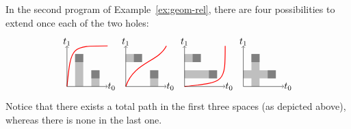 \documentclass[orivec]{llncs} \usepackage[T1]{fontenc}
\begin{document}
In the second program of Example~\ref{ex:geom-rel}, there are four possibilities
to extend once each of the two holes:
\begin{equation}
  \label{eq:ex-hole-ext}
  \begin{tikzpicture}[scale=.3]
    \draw[line width=0.3mm,color=red] (0,0) .. controls (.5,5) .. (5,5);
    \fill[fill=lightgray] (1,0) -- (1,4) -- (2,4) -- (2,0) -- cycle;
    \fill[fill=lightgray] (3,0) -- (3,2) -- (4,2) -- (4,0) -- cycle;
    \fill[fill=gray] (1,3) -- (2,3) -- (2,4) -- (1,4) -- cycle;
    \fill[fill=gray] (3,1) -- (4,1) -- (4,2) -- (3,2) -- cycle;
    \draw[->] (0,0) -- (5,0);
    \draw[->] (0,0) -- (0,5);
    \draw (5.5,0) node {$t_0$};
    \draw (0,5.5) node {$t_1$};
  \end{tikzpicture}
  \begin{tikzpicture}[scale=.3]
    \draw[line width=0.3mm,color=red] (0,0) .. controls (1,3) and (4,3) .. (5,5);
    \fill[fill=lightgray] (0,3) -- (0,4) -- (2,4) -- (2,3) -- cycle;
    \fill[fill=lightgray] (3,0) -- (3,2) -- (4,2) -- (4,0) -- cycle;
    \fill[fill=gray] (1,3) -- (2,3) -- (2,4) -- (1,4) -- cycle;
    \fill[fill=gray] (3,1) -- (4,1) -- (4,2) -- (3,2) -- cycle;
    \draw[->] (0,0) -- (5,0);
    \draw[->] (0,0) -- (0,5);
    \draw (5.5,0) node {$t_0$};
    \draw (0,5.5) node {$t_1$};
  \end{tikzpicture}
  \begin{tikzpicture}[scale=.3]
    \draw[line width=0.3mm,color=red] (0,0) .. controls (5,.5) .. (5,5);
    \fill[fill=lightgray] (0,1) -- (4,1) -- (4,2) -- (0,2) -- cycle;
    \fill[fill=lightgray] (0,3) -- (2,3) -- (2,4) -- (0,4) -- cycle;
    \fill[fill=gray] (1,3) -- (2,3) -- (2,4) -- (1,4) -- cycle;
    \fill[fill=gray] (3,1) -- (4,1) -- (4,2) -- (3,2) -- cycle;
    \draw[->] (0,0) -- (5,0);
    \draw[->] (0,0) -- (0,5);
    \draw (5.5,0) node {$t_0$};
    \draw (0,5.5) node {$t_1$};
  \end{tikzpicture}
  \begin{tikzpicture}[scale=.3]
    \fill[fill=lightgray] (1,0) -- (1,4) -- (2,4) -- (2,0) -- cycle;
    \fill[fill=lightgray,color=lightgray] (0,1) -- (0,2) -- (4,2) -- (4,1) -- cycle;
    \fill[fill=gray] (1,3) -- (2,3) -- (2,4) -- (1,4) -- cycle;
    \fill[fill=gray] (3,1) -- (4,1) -- (4,2) -- (3,2) -- cycle;
    \draw[->] (0,0) -- (5,0);
    \draw[->] (0,0) -- (0,5);
    \draw (5.5,0) node {$t_0$};
    \draw (0,5.5) node {$t_1$};
  \end{tikzpicture}
\end{equation}
Notice that there exists a total path in the first three spaces (as depicted
above), whereas there is none in the last one.
\end{document}
